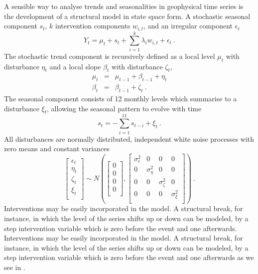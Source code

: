 \documentclass[jgrga]{agu2001}
\begin{document}
\begin{article}
A sensible way to analyse trends and seasonalities in geophysical time series
is the development of a structural model in state space form.  A stochastic
seasonal component $s_t$, $k$ intervention components $w_{i,t}$, and an
irregular component $\epsilon_t$
\begin{displaymath}
Y_t=\mu_t+s_t+\sum_{i=1}^{k}\lambda_iw_{i,t}+\epsilon_t\ .
\end{displaymath}
The stochastic trend component is recursively defined as a local level $\mu_t$ with disturbance $\eta_t$ and a
local slope $\beta_t$ with disturbance $\zeta_t$,
\begin{eqnarray}
\mu_t & = & \mu_{t-1} + \beta_{t-1}+\eta_t \nonumber \\
\beta_t & = & \beta_{t-1}+\zeta_t \ .\nonumber
\end{eqnarray}
The seasonal component consists of 12 monthly
levels which summarise to a disturbance $\xi_t$,
allowing the seasonal pattern to evolve with
time
\begin{displaymath}
s_t=-\sum_{i=1}^{11}s_{t-i}+\xi_t\ .
\end{displaymath}
All disturbances are normally distributed,
independent white noise processes with zero means
and constant variances
\begin{displaymath}
\left[
\begin{array}{l}
\epsilon_t \\
\eta_t \\
\zeta_t \\
\xi_t \\
\end{array}
\right]
\sim N
\left(
\left[
\begin{array}{c} 0 \\ 0 \\ 0 \\ 0 \\ \end{array}
\right],
\left[
\begin{array}{cccc} \sigma_\epsilon^2 & 0 & 0 & 0 \\ 0 & \sigma_\eta^2 & 0 & 0 \\ 0 & 0 & \sigma_\zeta^2 & 0 \\ 0 & 0 & 0 & \sigma_\xi^2 \\\end{array}
\right]
\right)\ . \label{eq:noise}
\end{displaymath}
Interventions may be easily incorporated in the model.
A structural break, for instance, in which the level of
the series shifts up or down
can be modeled, by a step intervention variable which is zero before the
event and one afterwards. 
Interventions may be easily incorporated in the model.
A structural break, for instance, in which the level of
the series shifts up or down
can be modeled, by a step intervention
variable which is zero before the
event and one afterwards as we see in 
.




\end{article}
\end{document}
